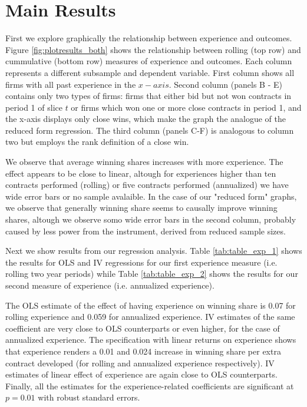 \section{Main Results}

First we explore graphically the relationship between experience and outcomes. Figure \ref{fig:plotresults_both} shows the relationship between rolling (top row) and cummulative (bottom row) measures of experience and outcomes. Each column represents a different subsample and dependent variable. First column shows all firms with all past experience in the $x-axis$. Second column (panels B - E) contains only two types of firms: firms that either bid but not won contracts in period 1 of slice $t$ or firms which won one or more close contracts in period  1, and the x-axis displays only close wins, which make the graph the analogue of the reduced form regression. The third column (panels C-F) is analogous to column two but employs the rank definition of a close win.

We observe that average winning shares increases with more experience. The effect appears to be close to linear, altough for experiences higher than ten contracts performed (rolling) or five contracts performed (annualized) we have wide error bars or no sample avalaible. In the case of our "reduced form" graphs, we observe that generally winning share seems to causally improve winning shares, altough we observe somo wide error bars in the second column, probably caused by less power from the instrument, derived from reduced sample sizes.

Next we show results from our regression analysis. Table \ref{tab:table_exp_1} shows the results for OLS and IV regressions for our first experience measure (i.e. rolling two year periods) while Table \ref{tab:table_exp_2} shows the results for our second measure of experience (i.e. annualized experience).

The OLS estimate of the effect of having experience on winning share is 0.07 for rolling experience and 0.059 for annualized experience. IV estimates of the same coefficient are very close to OLS counterparts or even higher, for the case of annualized experience. The specification with linear returns on experience shows that experience renders a 0.01 and 0.024 increase in winning share per extra contract developed (for rolling and annualized experience respectively). IV estimates of linear effect of experience are again close to OLS counterparts. Finally, all the estimates for the experience-related coefficients are significant at $p=0.01$ with robust standard errors.

